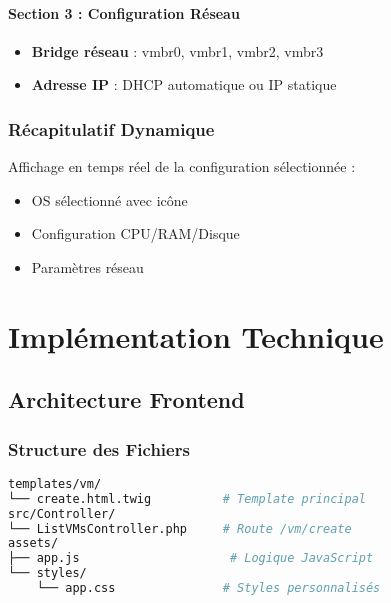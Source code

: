\documentclass[12pt,a4paper]{report}
\begin{document}
\subsubsection{Section 3 : Configuration Réseau}

\begin{itemize}
    \item \textbf{Bridge réseau} : vmbr0, vmbr1, vmbr2, vmbr3
    \item \textbf{Adresse IP} : DHCP automatique ou IP statique
\end{itemize}

\subsection{Récapitulatif Dynamique}

Affichage en temps réel de la configuration sélectionnée :

\begin{itemize}
    \item OS sélectionné avec icône
    \item Configuration CPU/RAM/Disque
    \item Paramètres réseau
\end{itemize}

\chapter{Implémentation Technique}

\section{Architecture Frontend}

\subsection{Structure des Fichiers}

\begin{lstlisting}[language=bash, caption=Structure des fichiers CreateVM]
templates/vm/
└── create.html.twig          # Template principal
src/Controller/
└── ListVMsController.php     # Route /vm/create
assets/
├── app.js                     # Logique JavaScript
└── styles/
    └── app.css               # Styles personnalisés
\end{lstlisting}
\end{document}
